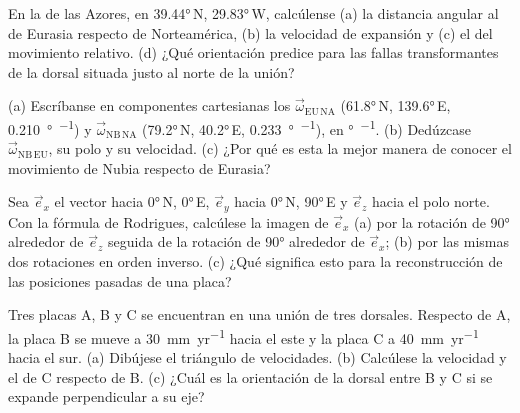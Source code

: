 \begin{exercise}[$\star\star$]\label{exo:b1:plate-kinematics:6}
En la  de las Azores, en \ang{39.44}\,N, \ang{29.83}\,W, calcúlense (a) la distancia angular al  de Eurasia
respecto de Norteamérica, (b) la velocidad de expansión y (c) el  del movimiento relativo. (d) ¿Qué orientación predice para las
fallas transformantes de la dorsal situada justo al norte de la unión?
\end{exercise}

\begin{exercise}[$\star\star$]\label{exo:b1:plate-kinematics:7}
(a) Escríbanse en componentes cartesianas los  $\vec\omega_{\mathrm{EU\,NA}}$ (\ang{61.8}\,N, \ang{139.6}\,E,
\qty{0.210}{\degree\per\Myr}) y $\vec\omega_{\mathrm{NB\,NA}}$ (\ang{79.2}\,N, \ang{40.2}\,E, \qty{0.233}{\degree\per\Myr}), en
\unit{\degree\per\Myr}. (b) Dedúzcase $\vec\omega_{\mathrm{NB\,EU}}$, su polo y su velocidad. (c) ¿Por qué es esta la mejor manera
de conocer el movimiento de Nubia respecto de Eurasia?
\end{exercise}

\begin{exercise}[$\star\star$]\label{exo:b1:plate-kinematics:8}
Sea $\vec e_x$ el vector hacia \ang{0}\,N, \ang{0}\,E, $\vec e_y$ hacia \ang{0}\,N, \ang{90}\,E y $\vec e_z$ hacia el polo norte. Con la
fórmula de Rodrigues, calcúlese la imagen de $\vec e_x$ (a) por la rotación de \ang{90} alrededor de $\vec e_z$ seguida de la rotación
de \ang{90} alrededor de $\vec e_x$; (b) por las mismas dos rotaciones en orden inverso. (c) ¿Qué significa esto para la
reconstrucción de las posiciones pasadas de una placa?
\end{exercise}

\begin{exercise}[$\star\star$]\label{exo:b1:plate-kinematics:9}
Tres placas A, B y C se encuentran en una unión de tres dorsales. Respecto de A, la placa B se mueve a \qty{30}{mm.yr^{-1}} hacia el este
y la placa C a \qty{40}{mm.yr^{-1}} hacia el sur. (a) Dibújese el triángulo de velocidades. (b) Calcúlese la velocidad y el  de C
respecto de B. (c) ¿Cuál es la orientación de la dorsal entre B y C si se expande perpendicular a su eje?
\end{exercise}

